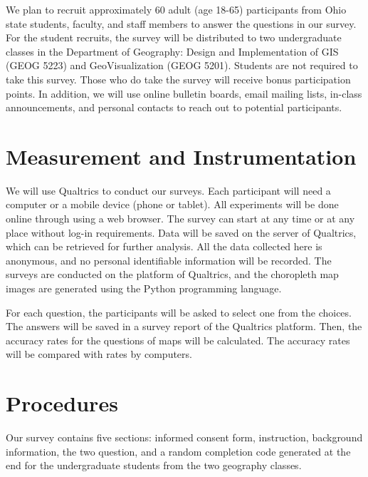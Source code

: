 We plan to recruit approximately 60 adult (age 18-65) participants from Ohio state students, faculty, and staff members to answer the questions in our survey. For the student recruits, the survey will be distributed to two undergraduate classes in the Department of Geography: Design and Implementation of GIS (GEOG 5223) and GeoVisualization (GEOG 5201). Students are not required to take this survey. Those who do take the survey will receive bonus participation points. In addition, we will use online bulletin boards, email mailing lists, in-class announcements, and personal contacts to reach out to potential participants. 

\section{Measurement and Instrumentation}

We will use Qualtrics to conduct our surveys. Each participant will need a computer or a mobile device (phone or tablet). All experiments will be done online through using a web browser. The survey can start at any time or at any place without log-in requirements. Data will be saved on the server of Qualtrics, which can be retrieved for further analysis. All the data collected here is anonymous, and no personal identifiable information will be recorded. The surveys are conducted on the platform of Qualtrics, and the choropleth map images are generated using the Python programming language. 

For each question, the participants will be asked to select one from the choices. The answers will be saved in a survey report of the Qualtrics platform. Then, the accuracy rates for the questions of maps will be calculated. The accuracy rates will be compared with rates by computers.

\section{Procedures}


Our survey contains five sections: informed consent form, instruction, background information, the two question, and a random completion code generated at the end for the undergraduate students from the two geography classes.

